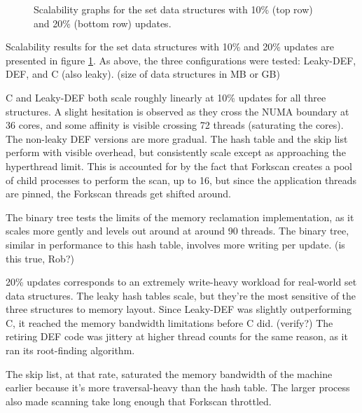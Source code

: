 \begin{figure}[tbp]
  \caption{Scalability graphs for the set data structures with 10\% (top row) and 20\% (bottom row) updates.}
  \label{fig:setdatastructures}
\end{figure}

Scalability results for the set data structures with 10\% and 20\% updates are presented in figure \ref{fig:setdatastructures}.  As above, the three configurations were tested: Leaky-DEF, DEF, and C (also leaky).  (size of data structures in MB or GB)

C and Leaky-DEF both scale roughly linearly at 10\% updates for all three structures.  A slight hesitation is observed as they cross the NUMA boundary at 36 cores, and some affinity is visible crossing 72 threads (saturating the cores).  The non-leaky DEF versions are more gradual.  The hash table and the skip list perform with visible overhead, but consistently scale except as approaching the hyperthread limit.  This is accounted for by the fact that Forkscan creates a pool of child processes to perform the scan, up to 16, but since the application threads are pinned, the Forkscan threads get shifted around.

The binary tree tests the limits of the memory reclamation implementation, as it scales more gently and levels out around at around 90 threads.  The binary tree, similar in performance to this hash table, involves more writing per update. (is this true, Rob?)

20\% updates corresponds to an extremely write-heavy workload for real-world set data structures.  The leaky hash tables scale, but they're the most sensitive of the three structures to memory layout.  Since Leaky-DEF was slightly outperforming C, it reached the memory bandwidth limitations before C did. (verify?)  The retiring DEF code was jittery at higher thread counts for the same reason, as it ran its root-finding algorithm.

The skip list, at that rate, saturated the memory bandwidth of the machine earlier because it's more traversal-heavy than the hash table.  The larger process also made scanning take long enough that Forkscan throttled.


